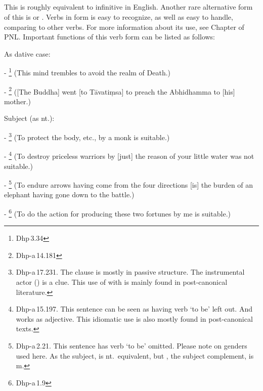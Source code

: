 \clearpage
{}
{}
\subsection*{}

This is roughly equivalent to infinitive in English. Another rare alternative form of this is  or . Verbs in  form is easy to recognize, as well as easy to handle, comparing to other  verbs. For more information about its use, see Chapter  of PNL. Important functions of this verb form can be listed as follows:

\begin{compactenum}[(1)]
\item As dative case:\par
- \footnote{Dhp\,3.34} (This mind trembles to avoid the realm of Death.)\par
- \footnote{Dhp-a\,14.181} ([The Buddha] went [to T\=avati\d msa] to preach the Abhidhamma to [his] mother.)\par

\item Subject (as nt.):\par
- \footnote{Dhp-a\,17.231. The  clause is mostly in passive structure. The instrumental actor () is a clue. This use of  with  is mainly found in post-canonical literature.} (To protect the body, etc., by a monk is suitable.)\par
- \footnote{Dhp-a\,15.197. This sentence can be seen as having verb `to be' left out. And  works as adjective. This idiomatic use is also mostly found in post-canonical texts.} (To destroy priceless warriors by [just] the reason of your little water was not suitable.)\par
- \footnote{Dhp-a\,2.21. This sentence has verb `to be' omitted. Please note on genders used here. As the subject,  is nt.\ equivalent, but , the subject complement, is m.} (To endure arrows having come from the four directions [is] the burden of an elephant having gone down to the battle.)\par
- \footnote{Dhp-a\,1.9} (To do the action for producing these two fortunes by me is suitable.)\par


\end{compactenum}
